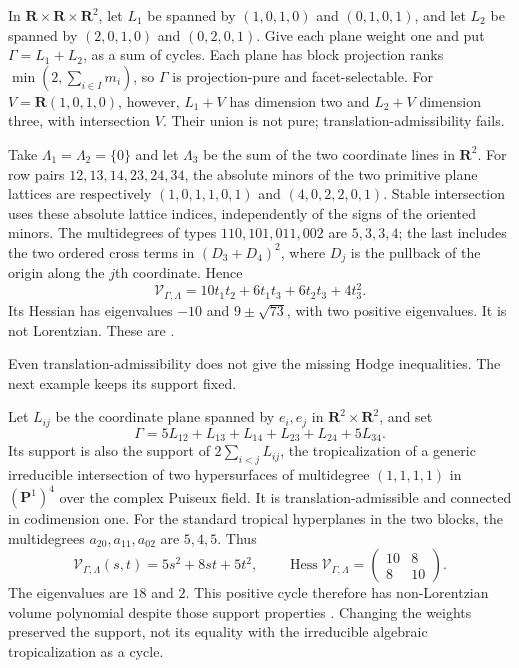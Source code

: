 \begin{example}
\label{ex:appG-tropical-support-without-Hodge}
In $\mathbf R\times\mathbf R\times\mathbf R^2$, let $L_1$
be spanned by $(1,0,1,0)$ and $(0,1,0,1)$, and let $L_2$
be spanned by $(2,0,1,0)$ and $(0,2,0,1)$. Give each plane
weight one and put $\Gamma=L_1+L_2$, as a sum of cycles.
Each plane has block
projection ranks $\min(2,\sum_{i\in I}m_i)$, so $\Gamma$
is projection-pure and facet-selectable. For
$V=\mathbf R(1,0,1,0)$, however, $L_1+V$ has dimension two
and $L_2+V$ dimension three, with intersection $V$.
Their union is not pure; translation-admissibility fails.

Take $\Lambda_1=\Lambda_2=\{0\}$ and let $\Lambda_3$ be
the sum of the two coordinate lines in $\mathbf R^2$.
For row pairs $12,13,14,23,24,34$, the absolute minors
of the two primitive plane lattices are respectively
$(1,0,1,1,0,1)$ and $(4,0,2,2,0,1)$.
Stable intersection uses these absolute lattice indices,
independently of the signs of the oriented minors. The
multidegrees of types $110,101,011,002$ are $5,3,3,4$;
the last includes the two ordered cross terms in
$(D_3+D_4)^2$, where $D_j$ is the pullback of the origin
along the $j$th coordinate. Hence
\[
 \mathcal V_{\Gamma,\Lambda}
      =10t_1t_2+6t_1t_3+6t_2t_3+4t_3^2.
\tag{G.36}\label{eq:appG-tropical-three-variable-counterexample}
\]
Its Hessian has eigenvalues $-10$ and $9\pm\sqrt{73}$,
with two positive eigenvalues. It is not Lorentzian.
These are \cite[Example~2.10 and Proposition~4.2]{CidRuiz26TropicalMultidegreesV2}.
\end{example}

Even translation-admissibility does not give the missing Hodge
inequalities. The next example keeps its support fixed.
\begin{example}
\label{ex:appG-tropical-reweighting-counterexample}
Let $L_{ij}$ be the coordinate plane spanned by $e_i,e_j$
in $\mathbf R^2\times\mathbf R^2$, and set
\[
 \Gamma=5L_{12}+L_{13}+L_{14}+L_{23}+L_{24}+5L_{34}.
\]
Its support is also the support of $2\sum_{i<j}L_{ij}$,
the tropicalization of a generic irreducible intersection of
two hypersurfaces of multidegree $(1,1,1,1)$ in
$(\mathbf P^1)^4$ over the complex Puiseux field.
It is translation-admissible and connected in codimension one.
For the standard tropical hyperplanes in the two blocks,
the multidegrees $a_{20},a_{11},a_{02}$ are $5,4,5$. Thus
\[
 \mathcal V_{\Gamma,\Lambda}(s,t)=5s^2+8st+5t^2,
 \qquad \operatorname{Hess}\mathcal V_{\Gamma,\Lambda}
                 =\begin{pmatrix}10&8\\8&10\end{pmatrix}.
\tag{G.37}\label{eq:appG-tropical-reweighted-volume}
\]
The eigenvalues are $18$ and $2$. This positive cycle therefore
has non-Lorentzian volume polynomial despite those support
properties \cite[Proposition~4.3]{CidRuiz26TropicalMultidegreesV2}.
Changing the weights preserved the support, not its equality
with the irreducible algebraic tropicalization as a cycle.
\end{example}

